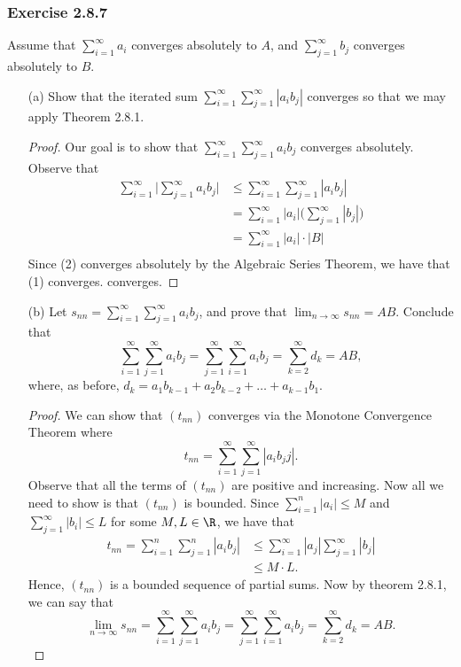 \subsubsection{Exercise 2.8.7}
Assume that \( \sum_{ i=1 }^{ \infty  } a_i  \) converges absolutely to \( A  \), and \( \sum_{ j=1 }^{ \infty  } b_j  \) converges absolutely to \( B \). 
\begin{enumerate}
    \item[(a)] Show that the iterated sum \( \sum_{ i=1 }^{ \infty  } \sum_{ j=1 }^{ \infty  } | a_i b_j |  \) converges so that we may apply Theorem 2.8.1. 
    \begin{proof}
    Our goal is to show that \( \sum_{ i=1 }^{ \infty  } \sum_{ j=1 }^{ \infty  } a_i b_j  \) converges absolutely. Observe that 
    \begin{align*}
        \sum_{ i=1 }^{ \infty  } \Big| \sum_{ j=1 }^{ \infty  } a_i b_j  \Big| &\leq \sum_{ i=1 }^{ \infty  } \sum_{ j=1 }^{\infty } | a_i b_j  | \tag{1} \\
                                                                               &= \sum_{ i=1 }^{ \infty  } | a_i  |  \Big( \sum_{ j=1 }^{ \infty  } | b_j |  \Big) \\
                                                                               &= \sum_{ i=1 }^{ \infty  } | a_i | \cdot | B | \tag{2}\\
    \end{align*}
    Since (2) converges absolutely by the Algebraic Series Theorem, we have that (1) converges. 
    converges. 
    \end{proof}
\item[(b)] Let \( s_{nn} = \sum_{ i=1 }^{ \infty  } \sum_{ j=1 }^{ \infty  } a_i b_j   \), and prove that \( \lim_{ n \to \infty  } s_{nn} = AB\). Conclude that 
    \[ \sum_{ i=1 }^{ \infty  } \sum_{ j=1 }^{ \infty  }a_i b_j = \sum_{ j=1 }^{ \infty  } \sum_{ i=1 }^{ \infty  } a_i b_j = \sum_{ k=2 }^{ \infty  } d_k = AB, \]
    where, as before, \( d_k = a_1b_{k-1} + a_2 b_{k-2} + \dots + a_{k-1} b_1. \)
    \begin{proof}
        We can show that \( (t_{nn}) \) converges via the Monotone Convergence Theorem where
        \[ t_{nn} = \sum_{ i=1 }^{ \infty  } \sum_{ j=1 }^{ \infty  } |a_{i} b_jj|. \]
        Observe that all the terms of \( (t_{nn}) \) are positive and increasing. Now all we need to show is that \( (t_{nn}) \) is bounded. Since \( \sum_{ i=1 }^{ n  } | a_i | \leq M  \) and \( \sum_{ j=1 }^{ \infty  } | b_i | \leq L \) for some \( M, L \in \R \), we have that 
        \begin{align*}
            t_{nn} = \sum_{ i=1 }^{ n } \sum_{ j=1 }^{ n } | a_i b_j | &\leq \sum_{ i=1 }^{ \infty  } | a_j | \sum_{ j=1 }^{ \infty  } | b_j |  \\
                                                                       &\leq M \cdot L. 
        \end{align*}
        Hence, \( (t_{nn}) \) is a bounded sequence of partial sums. Now by theorem 2.8.1, we can say that 
    \[\lim_{ n \to \infty  } s_{nn} =  \sum_{ i=1 }^{ \infty  } \sum_{ j=1 }^{ \infty  }a_i b_j = \sum_{ j=1 }^{ \infty  } \sum_{ i=1 }^{ \infty  } a_i b_j = \sum_{ k=2 }^{ \infty  } d_k = AB. \]


\end{proof}
\end{enumerate}
